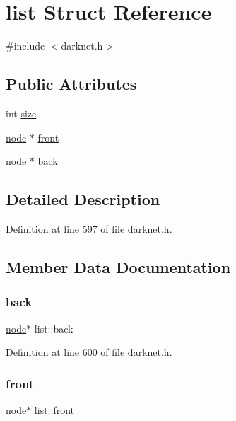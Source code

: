 \hypertarget{structlist}{}\section{list Struct Reference}
\label{structlist}


{\ttfamily \#include $<$darknet.\+h$>$}

\subsection*{Public Attributes}
\begin{DoxyCompactItemize}
\item 
int \mbox{\hyperlink{structlist_a3b03adad0c0429bae9493667ff366dc2}{size}}
\item 
\mbox{\hyperlink{structnode}{node}} $\ast$ \mbox{\hyperlink{structlist_ab5edf0018b269f7eae3d7100ddcea049}{front}}
\item 
\mbox{\hyperlink{structnode}{node}} $\ast$ \mbox{\hyperlink{structlist_a92ca5a25484052f219cddb80380a3013}{back}}
\end{DoxyCompactItemize}


\subsection{Detailed Description}


Definition at line 597 of file darknet.\+h.



\subsection{Member Data Documentation}
\mbox{\label{structlist_a92ca5a25484052f219cddb80380a3013}} 
\subsubsection{\texorpdfstring{back}{back}}
{\footnotesize\ttfamily \mbox{\hyperlink{structnode}{node}}$\ast$ list\+::back}



Definition at line 600 of file darknet.\+h.

\mbox{\label{structlist_ab5edf0018b269f7eae3d7100ddcea049}} 
\subsubsection{\texorpdfstring{front}{front}}
{\footnotesize\ttfamily \mbox{\hyperlink{structnode}{node}}$\ast$ list\+::front}




